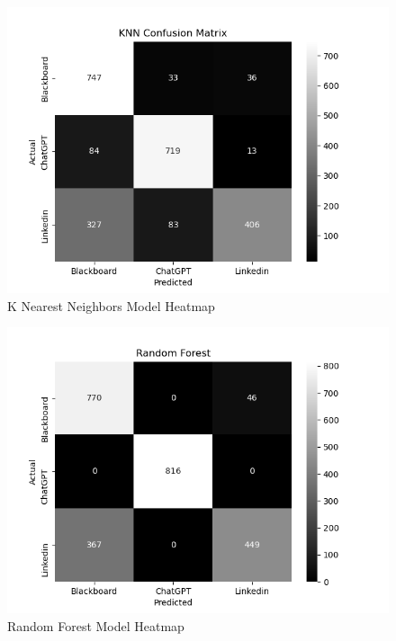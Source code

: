 \documentclass[10pt,sigconf,letterpaper,nonacm]{acmart}
\begin{document}
\begin{figure}
    \centering
    \includegraphics[width=1\linewidth]{Figures_and_Graphs/ConfusionMatrixKNN.png}
    \caption{K Nearest Neighbors Model Heatmap}
    \label{fig:knn_heatmap}
\end{figure}

\begin{figure}
    \centering
    \includegraphics[width=1\linewidth]{Figures_and_Graphs/ConfusionMatrixRF.png}
    \caption{Random Forest Model Heatmap}
    \label{fig:rf_heatmap}
\end{figure}
\end{document}
